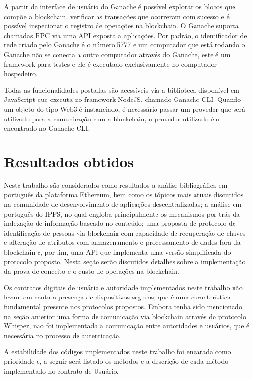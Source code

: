 \documentclass[tcc,capa]{texufpel}
\begin{document}
    A partir da interface de usuário do Ganache é possível explorar os blocos que compõe a blockchain, verificar as transações que ocorreram com sucesso e é possível inspecionar o registro de operações na blockchain. O Ganache suporta chamadas RPC via uma API exposta a aplicações. Por padrão, o identificador de rede criado pelo Ganache é o número 5777 e um computador que está rodando o Ganache não se conecta a outro computador através do Ganache, este é um framework para testes e ele é executado exclusivamente no computador hospedeiro.
    
    Todas as funcionalidades postadas são acessíveis via a biblioteca disponível em JavaScript que executa no framework NodeJS, chamado Ganache-CLI. Quando um objeto do tipo Web3 é instanciado, é necessário passar um provedor que será utilizado para a comunicação com a blockchain, o provedor utilizado é o encontrado no Ganache-CLI.
    


\chapter{Resultados obtidos}\label{chap:resultados}

    Neste trabalho são considerados como resultados a análise bibliográfica em português da plataforma Ethereum, bem como os tópicos mais atuais discutidos na comunidade de desenvolvimento de aplicações descentralizadas; a análise em português do IPFS, no qual engloba principalmente os mecanismos por trás da indexação de informação baseado no conteúdo; uma proposta de protocolo de identificação de pessoas via blockchain com capacidade de recuperação de chaves e alteração de atributos com armazenamento e processamento de dados fora da blockchain e, por fim, uma API que implementa uma versão simplificada do protocolo proposto. Nesta seção serão discutidos detalhes sobre a implementação da prova de conceito e o custo de operações na blockchain.
    
    Os contratos digitais de usuário e autoridade implementados neste trabalho não levam em conta a presença de dispositivos seguros, que é uma característica fundamental presente nos protocolos propostos. Embora tenha sido mencionado na seção anterior uma forma de comunicação via blockchain através do protocolo Whisper, não foi implementada a comunicação entre autoridades e usuários, que é necessária no processo de autenticação.
    
    A estabilidade dos códigos implementados neste trabalho foi encarada como prioridade e, a seguir será listado os métodos e a descrição de cada método implementado no contrato de Usuário.
    
\end{document}
